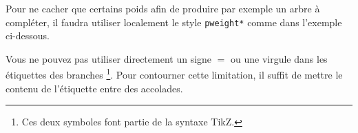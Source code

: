 \documentclass[12pt,a4paper]{article}
\begin{document}





Pour ne cacher que certains poids afin de produire par exemple un arbre à compléter, il faudra utiliser localement le style \verb+pweight*+ comme dans l'exemple ci-dessous.






Vous ne pouvez pas utiliser directement un signe $=$ ou une virgule dans les étiquettes des branches
\footnote{
	Ces deux symboles font partie de la syntaxe TikZ.
}.
Pour contourner cette limitation, il suffit de mettre le contenu de l'étiquette entre des accolades.

\end{document}
